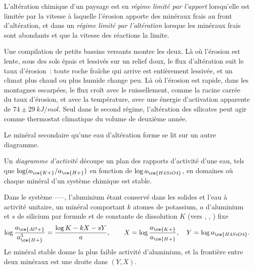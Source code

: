 \begin{definition}\label{def:b3:water-rock-interaction:regimes}
L'altération chimique d'un paysage est en \emph{régime limité par
l'apport} lorsqu'elle est limitée par la vitesse à laquelle
l'érosion apporte des minéraux frais au front d'altération, et dans un
\emph{régime limité par l'altération} lorsque les
minéraux frais sont abondants et que la vitesse des réactions la limite.
\end{definition}

Une compilation de petits bassins versants montre les deux. Là où l'érosion est lente, sous
des sols épais et lessivés sur un relief doux, le flux d'altération suit le
taux d'érosion~: toute roche fraîche qui arrive est entièrement lessivée, et un climat plus chaud ou
plus humide change peu. Là où l'érosion est rapide, dans les montagnes escarpées, le
flux croît avec le ruissellement, comme la racine carrée du taux d'érosion, et avec
la température, avec une énergie d'activation apparente de $74 \pm
\qty{29}{kJ/mol}$. Seul dans le second régime, l'altération des silicates peut agir comme
thermostat climatique du volume de deuxième année.

Le minéral secondaire qu'une eau d'altération forme se lit sur un autre
diagramme.

\begin{definition}\label{def:b3:water-rock-interaction:activity-diagram}
Un \emph{diagramme d'activité}
découpe un plan des rapports d'activité d'une eau, tels que
$\log(a_{\ce{K+}}/a_{\ce{H+}})$ en fonction de $\log a_{\ce{H4SiO4}}$, en
domaines où chaque minéral d'un système chimique est stable.
\end{definition}

\begin{proposition}\label{prop:b3:water-rock-interaction:boundaries}
Dans le système ------, l'aluminium étant conservé dans les solides
et l'eau à activité unitaire, un minéral comportant $k$ atomes de potassium, $a$ d'aluminium et
$s$ de silicium par formule et de constante de dissolution $K$ (vers ,
, ) fixe
\[
\log\frac{a_{\ce{Al^3+}}}{a_{\ce{H+}}^3} = \frac{\log K - kX - sY}{a},
\qquad X = \log\frac{a_{\ce{K+}}}{a_{\ce{H+}}},\quad Y = \log a_{\ce{H4SiO4}}.
\]
Le minéral stable donne la plus faible activité d'aluminium, et la frontière
entre deux minéraux est une droite dans $(Y, X)$.
\end{proposition}

